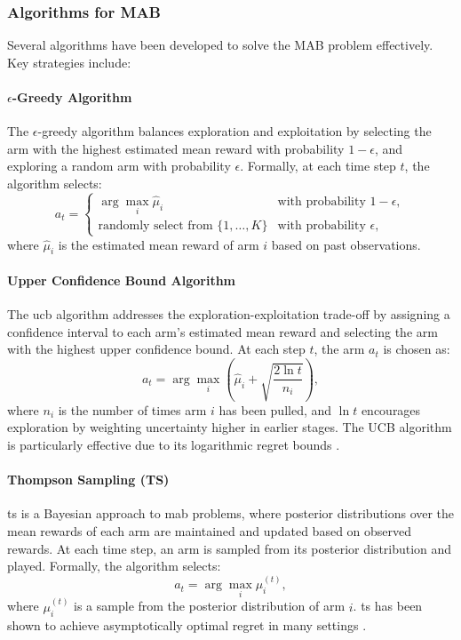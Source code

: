 \subsubsection{Algorithms for MAB}
Several algorithms have been developed to solve the MAB problem effectively. Key strategies include:

\paragraph{$\epsilon$-Greedy Algorithm}
The $\epsilon$-greedy algorithm balances exploration and exploitation by selecting the arm with the highest estimated mean reward with probability $1 - \epsilon$, and exploring a random arm with probability $\epsilon$. Formally, at each time step $t$, the algorithm selects:
\begin{equation}
    a_t =
    \begin{cases}
        \arg \max_i \hat{\mu}_i & \text{with probability } 1 - \epsilon, \\
        \text{randomly select from } \{1, \ldots, K\} & \text{with probability } \epsilon,
    \end{cases}
\end{equation}
where $\hat{\mu}_i$ is the estimated mean reward of arm $i$ based on past observations.

\paragraph{Upper Confidence Bound Algorithm}
The \ac{ucb} algorithm addresses the exploration-exploitation trade-off by assigning a confidence interval to each arm’s estimated mean reward and selecting the arm with the highest upper confidence bound. At each step $t$, the arm $a_t$ is chosen as:
\begin{equation}
    a_t = \arg \max_i \left( \hat{\mu}_i + \sqrt{\frac{2 \ln t}{n_i}} \right),
\end{equation}
where $n_i$ is the number of times arm $i$ has been pulled, and $\ln t$ encourages exploration by weighting uncertainty higher in earlier stages. The UCB algorithm is particularly effective due to its logarithmic regret bounds \citep{auer2002finite}.

\paragraph{Thompson Sampling (TS)}
\acf{ts} is a Bayesian approach to \ac{mab} problems, where posterior distributions over the mean rewards of each arm are maintained and updated based on observed rewards. At each time step, an arm is sampled from its posterior distribution and played. Formally, the algorithm selects:
\begin{equation}
    a_t = \arg \max_i \mu_i^{(t)},
\end{equation}
where $\mu_i^{(t)}$ is a sample from the posterior distribution of arm $i$. \ac{ts} has been shown to achieve asymptotically optimal regret in many settings \citep{agrawal2012analysis}.

